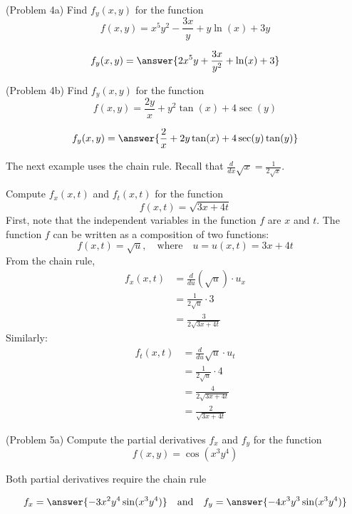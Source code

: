 \documentclass[handout]{ximera}
\begin{document}
\begin{problem}(Problem 4a)
Find $f_y(x,y)$ for the function 
\[
f(x,y) = x^5y^2 - \frac{3x}{y} + y\ln(x) + 3y
\]

\[
f_y(x,y) = \answer{2x^5 y + \frac{3x}{y^2} + \ln(x) + 3}
\]
\end{problem}

\begin{problem}(Problem 4b)
Find $f_y(x,y)$ for the function 
\[
f(x,y) = \frac{2y}{x} + y^2\tan(x) + 4\sec(y)
\]

\[
f_y(x,y) = \answer{\frac{2}{x} + 2y\tan(x) + 4\sec(y)\tan(y)}
\]
\end{problem}

The next example uses the chain rule.  Recall that $\frac{d}{dx} \sqrt x = \frac{1}{2\sqrt x}$.

\begin{example}[Example 5]
Compute $f_x(x,t)$ and $f_t(x,t)$ for the function 
\[
f(x,t) = \sqrt{3x + 4t}
\]
First, note that the independent variables in the function $f$ are $x$ and $t$.
The function $f$ can be written as a composition of two functions:
\[
f(x,t) = \sqrt {u}, \quad \text{where} \quad u= u(x,t) = 3x + 4t
\]
From the chain rule,
\begin{align*}
f_x(x,t) &= \frac{d}{du}\left( \sqrt u\right) \cdot u_x\\
  & = \frac{1}{2\sqrt u} \cdot 3\\
  &= \frac{3}{2\sqrt{3x + 4t}}
\end{align*}
Similarly:
\begin{align*}
f_t(x,t) &= \frac{d}{du} \sqrt u \cdot u_t\\
  & = \frac{1}{2\sqrt u} \cdot 4\\
  &= \frac{4}{2\sqrt{3x + 4t}}\\
 &= \frac{2}{\sqrt{3x + 4t}}
\end{align*}
  
\end{example}

\begin{problem}(Problem 5a)
Compute the partial derivatives $f_x$ and $f_y$ for the function
\[
f(x,y) = \cos(x^3y^4)
\]
\begin{hint}
Both partial derivatives require the chain rule
\end{hint}

\[
f_x = \answer{-3x^2y^4 \sin(x^3y^4)} \quad \text{and} \quad f_y = \answer{-4x^3y^3 \sin(x^3y^4)}
\]
\end{problem}
\end{document}
